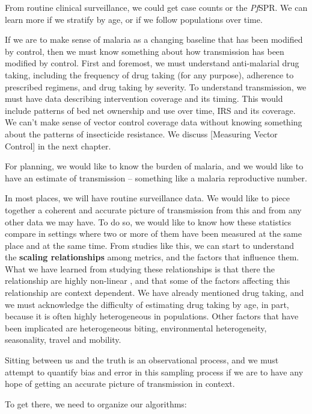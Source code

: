 \documentclass[
]{book}
\begin{document}
From routine clinical surveillance, we could get case counts or the \emph{Pf}SPR. We can learn more if we stratify by age, or if we follow populations over time.

If we are to make sense of malaria as a changing baseline that has been modified by control, then we must know something about how transmission has been modified by control. First and foremost, we must understand anti-malarial drug taking, including the frequency of drug taking (for any purpose), adherence to prescribed regimens, and drug taking by severity. To understand transmission, we must have data describing intervention coverage and its timing. This would include patterns of bed net ownership and use over time, IRS and its coverage. We can't make sense of vector control coverage data without knowing something about the patterns of insecticide resistance. We discuss {[}Measuring Vector Control{]} in the next chapter.

For planning, we would like to know the burden of malaria, and we would like to have an estimate of transmission -- something like a malaria reproductive number.

In most places, we will have routine surveillance data. We would like to piece together a coherent and accurate picture of transmission from this and from any other data we may have. To do so, we would like to know how these statistics compare in settings where two or more of them have been measured at the same place and at the same time. From studies like this, we can start to understand the \textbf{scaling relationships} among metrics, and the factors that influence them. What we have learned from studying these relationships is that there the relationship are highly non-linear \autocite{HaySI2008MeasuringMalaria}, and that some of the factors affecting this relationship are context dependent. We have already mentioned drug taking, and we must acknowledge the difficulty of estimating drug taking by age, in part, because it is often highly heterogeneous in populations. Other factors that have been implicated are heterogeneous biting, environmental heterogeneity, seasonality, travel and mobility.

Sitting between us and the truth is an observational process, and we must attempt to quantify bias and error in this sampling process if we are to have any hope of getting an accurate picture of transmission in context.

To get there, we need to organize our algorithms:
\end{document}

